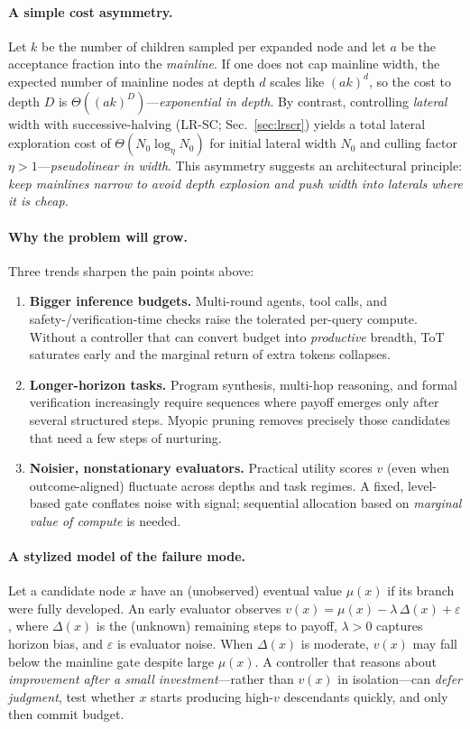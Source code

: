 \documentclass{article}
\begin{document}
\paragraph{A simple cost asymmetry.}
Let $k$ be the number of children sampled per expanded node and let $a$ be the acceptance fraction into the \emph{mainline}.
If one does not cap mainline width, the expected number of mainline nodes at depth $d$ scales like $(ak)^d$, so the cost to depth $D$ is $\Theta((ak)^D)$—\emph{exponential in depth}.
By contrast, controlling \emph{lateral} width with successive-halving (LR-SC; Sec.~\ref{sec:lrscr}) yields a total lateral exploration cost of $\Theta(N_0 \log_{\eta} N_0)$ for initial lateral width $N_0$ and culling factor $\eta>1$—\emph{pseudolinear in width}.
This asymmetry suggests an architectural principle:
\emph{keep mainlines narrow to avoid depth explosion and push width into laterals where it is cheap.}

\paragraph{Why the problem will grow.}
Three trends sharpen the pain points above:
\begin{enumerate}[leftmargin=*, itemsep=2pt, topsep=2pt]
    \item \textbf{Bigger inference budgets.} Multi-round agents, tool calls, and safety-/verification-time checks raise the tolerated per-query compute. Without a controller that can convert budget into \emph{productive} breadth, ToT saturates early and the marginal return of extra tokens collapses.
    \item \textbf{Longer-horizon tasks.} Program synthesis, multi-hop reasoning, and formal verification increasingly require sequences where payoff emerges only after several structured steps. Myopic pruning removes precisely those candidates that need a few steps of nurturing.
    \item \textbf{Noisier, nonstationary evaluators.} Practical utility scores $v$ (even when outcome-aligned) fluctuate across depths and task regimes. A fixed, level-based gate conflates noise with signal; sequential allocation based on \emph{marginal value of compute} is needed.
\end{enumerate}

\paragraph{A stylized model of the failure mode.}
Let a candidate node $x$ have an (unobserved) eventual value $\mu(x)$ if its branch were fully developed.
An early evaluator observes $v(x) = \mu(x) - \lambda \,\Delta(x) + \varepsilon$, where $\Delta(x)$ is the (unknown) remaining steps to payoff, $\lambda>0$ captures horizon bias, and $\varepsilon$ is evaluator noise.
When $\Delta(x)$ is moderate, $v(x)$ may fall below the mainline gate despite large $\mu(x)$.
A controller that reasons about \emph{improvement after a small investment}—rather than $v(x)$ in isolation—can \emph{defer judgment}, test whether $x$ starts producing high-$v$ descendants quickly, and only then commit budget.
\end{document}
